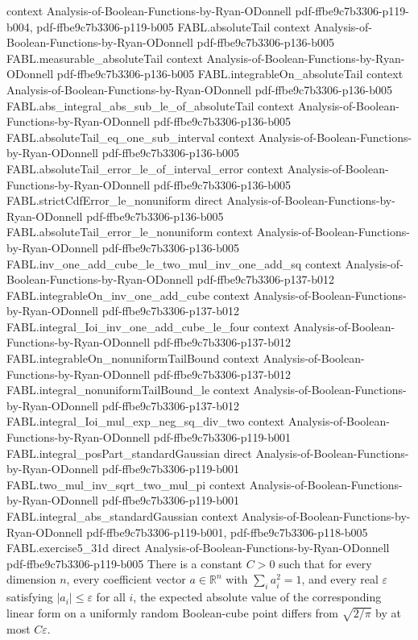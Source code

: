 \begin{theorem}
  {context}
  {Analysis-of-Boolean-Functions-by-Ryan-ODonnell}
  {pdf-ffbe9c7b3306-p119-b004,
    pdf-ffbe9c7b3306-p119-b005}
\proofstep
  {FABL.absoluteTail}
  {context}
  {Analysis-of-Boolean-Functions-by-Ryan-ODonnell}
  {pdf-ffbe9c7b3306-p136-b005}
\proofstep
  {FABL.measurable_absoluteTail}
  {context}
  {Analysis-of-Boolean-Functions-by-Ryan-ODonnell}
  {pdf-ffbe9c7b3306-p136-b005}
\proofstep
  {FABL.integrableOn_absoluteTail}
  {context}
  {Analysis-of-Boolean-Functions-by-Ryan-ODonnell}
  {pdf-ffbe9c7b3306-p136-b005}
\proofstep
  {FABL.abs_integral_abs_sub_le_of_absoluteTail}
  {context}
  {Analysis-of-Boolean-Functions-by-Ryan-ODonnell}
  {pdf-ffbe9c7b3306-p136-b005}
\proofstep
  {FABL.absoluteTail_eq_one_sub_interval}
  {context}
  {Analysis-of-Boolean-Functions-by-Ryan-ODonnell}
  {pdf-ffbe9c7b3306-p136-b005}
\proofstep
  {FABL.absoluteTail_error_le_of_interval_error}
  {context}
  {Analysis-of-Boolean-Functions-by-Ryan-ODonnell}
  {pdf-ffbe9c7b3306-p136-b005}
\proofstep
  {FABL.strictCdfError_le_nonuniform}
  {direct}
  {Analysis-of-Boolean-Functions-by-Ryan-ODonnell}
  {pdf-ffbe9c7b3306-p136-b005}
\proofstep
  {FABL.absoluteTail_error_le_nonuniform}
  {context}
  {Analysis-of-Boolean-Functions-by-Ryan-ODonnell}
  {pdf-ffbe9c7b3306-p136-b005}
\proofstep
  {FABL.inv_one_add_cube_le_two_mul_inv_one_add_sq}
  {context}
  {Analysis-of-Boolean-Functions-by-Ryan-ODonnell}
  {pdf-ffbe9c7b3306-p137-b012}
\proofstep
  {FABL.integrableOn_inv_one_add_cube}
  {context}
  {Analysis-of-Boolean-Functions-by-Ryan-ODonnell}
  {pdf-ffbe9c7b3306-p137-b012}
\proofstep
  {FABL.integral_Ioi_inv_one_add_cube_le_four}
  {context}
  {Analysis-of-Boolean-Functions-by-Ryan-ODonnell}
  {pdf-ffbe9c7b3306-p137-b012}
\proofstep
  {FABL.integrableOn_nonuniformTailBound}
  {context}
  {Analysis-of-Boolean-Functions-by-Ryan-ODonnell}
  {pdf-ffbe9c7b3306-p137-b012}
\proofstep
  {FABL.integral_nonuniformTailBound_le}
  {context}
  {Analysis-of-Boolean-Functions-by-Ryan-ODonnell}
  {pdf-ffbe9c7b3306-p137-b012}
\proofstep
  {FABL.integral_Ioi_mul_exp_neg_sq_div_two}
  {context}
  {Analysis-of-Boolean-Functions-by-Ryan-ODonnell}
  {pdf-ffbe9c7b3306-p119-b001}
\proofstep
  {FABL.integral_posPart_standardGaussian}
  {direct}
  {Analysis-of-Boolean-Functions-by-Ryan-ODonnell}
  {pdf-ffbe9c7b3306-p119-b001}
\proofstep
  {FABL.two_mul_inv_sqrt_two_mul_pi}
  {context}
  {Analysis-of-Boolean-Functions-by-Ryan-ODonnell}
  {pdf-ffbe9c7b3306-p119-b001}
\proofstep
  {FABL.integral_abs_standardGaussian}
  {context}
  {Analysis-of-Boolean-Functions-by-Ryan-ODonnell}
  {pdf-ffbe9c7b3306-p119-b001,
    pdf-ffbe9c7b3306-p118-b005}
\proofstep
  {FABL.exercise5_31d}
  {direct}
  {Analysis-of-Boolean-Functions-by-Ryan-ODonnell}
  {pdf-ffbe9c7b3306-p119-b005}
There is a constant $C>0$ such that for every dimension $n$, every coefficient vector
$a\in\mathbb R^n$ with $\sum_i a_i^2=1$, and every real $\varepsilon$ satisfying
$|a_i|\le\varepsilon$ for all $i$, the expected absolute value of the corresponding
linear form on a uniformly random Boolean-cube point differs from $\sqrt{2/\pi}$ by at
most $C\varepsilon$.
\end{theorem}
